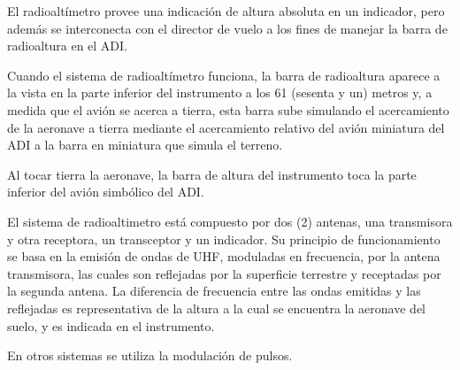 \documentclass[a4paper,12pt,twoside]{article}
\begin{document}
El radioalt\'imetro provee una indicaci\'on de altura absoluta en un indicador,
pero adem\'as se interconecta con el director de vuelo a los fines
de manejar la barra de radioaltura en el ADI.

Cuando el sistema de radioalt\'imetro funciona, la barra de radioaltura aparece a la vista
en la parte inferior del instrumento a los 61 (sesenta y un) metros y, a medida que
el avi\'on se acerca a tierra, esta barra sube simulando el acercamiento de la aeronave
a tierra mediante el acercamiento relativo del avi\'on miniatura del ADI
a la barra en miniatura que simula el terreno.

Al tocar tierra la aeronave, la barra de altura del instrumento toca la parte
inferior del avi\'on simb\'olico del ADI.

El sistema de radioaltimetro est\'a compuesto por dos (2) antenas, una transmisora
y otra receptora, un transceptor y un indicador.
Su principio de funcionamiento se basa en la emisi\'on de ondas de UHF, moduladas
en frecuencia, por la antena transmisora, las cuales son reflejadas por la superficie
terrestre y receptadas por la segunda antena. La diferencia de frecuencia entre
las ondas emitidas y las reflejadas es representativa de la altura a la cual se
encuentra la aeronave del suelo, y es indicada en el instrumento.

En otros sistemas se utiliza la modulaci\'on de pulsos.
\end{document}
